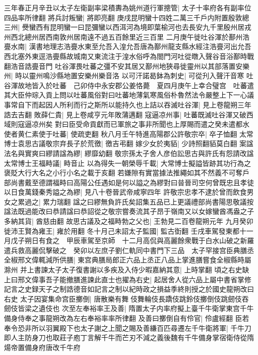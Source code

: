 三年春正月辛丑以太子左衛副率梁積夀為姚州道行軍摠管|{
	太子十率府各有副率位四品率所律翻}
將兵討叛蠻|{
	將即亮翻}
庚戌昆明蠻十四姓二萬三千戶内附置殷敦總三州|{
	㸑蠻西有昆明蠻一曰昆彌蠻以西洱河為境即葉榆河也去長安九千里殷州居戎州西北總州居西南敦州居南遠不過五百餘里近三百里}
二月庚午徙吐谷渾於鄯州浩亹水南|{
	漢書地理志浩亹水東至允吾入湟允吾唐為鄯州龍支縣水經注浩亹河出允吾西北塞外東逕浩亹縣故城南又東流注于湟水俗呼為閤門河吐從暾入聲谷音浴鄯時戰翻浩音誥亹音門}
吐谷渾畏吐蕃之彊不安其居又鄯州地狹尋徙靈州以其部落置安樂州|{
	時以靈州鳴沙縣地置安樂州樂音洛}
以可汗諾曷鉢為刺史|{
	可從刋入聲汗音寒}
吐谷渾故地皆入於吐蕃　己卯侍中永安郡公姜恪薨　夏四月庚午上幸合璧宫　吐蕃遣其大臣仲琮入貢上問以吐蕃風俗對曰吐蕃地薄氣寒風俗朴魯然法令嚴整上下一心議事常自下而起因人所利而行之斯所以能持久也上詰以吞滅吐谷渾|{
	見上卷龍朔三年誥去吉翻}
敗薛仁貴|{
	見上卷咸亨元年敗蒲邁翻}
寇逼凉州事|{
	吐蕃既滅吐谷渾又破西域則寇逼凉州矣}
對曰臣受命貢獻而已軍旅之事非所聞也上厚賜而遣之癸未遣都水使者黄仁素使于吐蕃|{
	使疏吏翻}
秋八月壬午特進高陽郡公許敬宗卒|{
	卒子恤翻}
太常博士袁思古議敬宗弃長子於荒徼|{
	徼吉弔翻}
嫁少女於夷貊|{
	少詩照翻貊莫白翻}
案諡法名與實爽曰繆請諡為繆|{
	繆靡幼翻}
敬宗孫太子舍人彦伯訟思古與許氏有怨請改諡太常博士王福畤議|{
	畤音止}
以為得失一朝榮辱千載|{
	大常博士擬謚皆跡其功行為之褒貶大行大名之小行小名之載于亥翻}
若嫌隙有實當據法推繩如其不然義不可奪戶部尚書戴至德謂福畤曰高陽公任遇如是何以謚之為繆對曰㫺晉司空何曾既忠且孝徒以日食萬錢秦秀謚之為繆|{
	見八十卷晉武帝咸寧四年}
許敬宗忠孝不逮於曾而飲食男女之累過之|{
	累力瑞翻}
諡之曰繆無負許氏矣詔集五品已上更議禮部尚書陽思敬議按諡法既過能改曰恭請諡曰恭詔從之敬宗嘗奏流其子昂于嶺南又以女嫁蠻酋馮盎之子多納其貨|{
	酋慈由翻}
故思古議及之福畤勃之父也|{
	王勃見二百卷龍朔元年}
九月癸卯徙沛王賢為雍王|{
	雍於用翻}
冬十月己未詔太子監國|{
	監古衘翻}
壬戌車駕發東都十一月戊子朔日有食之　甲辰車駕至京師　十二月高侃與高麗餘衆戰于白水山破之新羅遣兵救高麗侃擊破之　癸卯以左庶子劉仁軌同中書門下三品　太子罕接宫臣典膳丞全椒邢文偉輒減所供膳|{
	東宫典膳局郎正六品上丞正八品上掌進膳嘗食全椒縣時屬滁州}
并上書諫太子太子復書謝以多疾及入侍少暇嘉納其意|{
	上時掌翻}
頃之右史缺上曰邢文偉事吾子能撤膳進諫此直士也擢為右史|{
	起居舍人從六品上屬中書省掌修記言之史録天子之制誥德音如記言之制以紀時政之損益季終則授之於國史龍朔改曰右史}
太子因宴集命宫臣擲倒|{
	唐散樂有舞伎舞輪伎長蹻伎跳鈴伎擲倒伎跳劒伎吞劒伎皆梁之遺伎也}
次至左奉裕率王及善|{
	隋置太子内率府擬上臺千牛衛掌東宫千牛備身侍奉之事龍朔改為左右奉裕率率所律翻}
及善曰擲倒自有伶官|{
	伶盧經翻}
臣若奉令恐非所以羽翼殿下也太子謝之上聞之賜及善縑百匹尋遷左千牛衛將軍|{
	千牛刀即人主防身刀也取莊子庖丁言解千牛而芒刃不減之義後魏有千牛備身掌宿衛侍從隋煬帝置備身府唐改千牛府}


